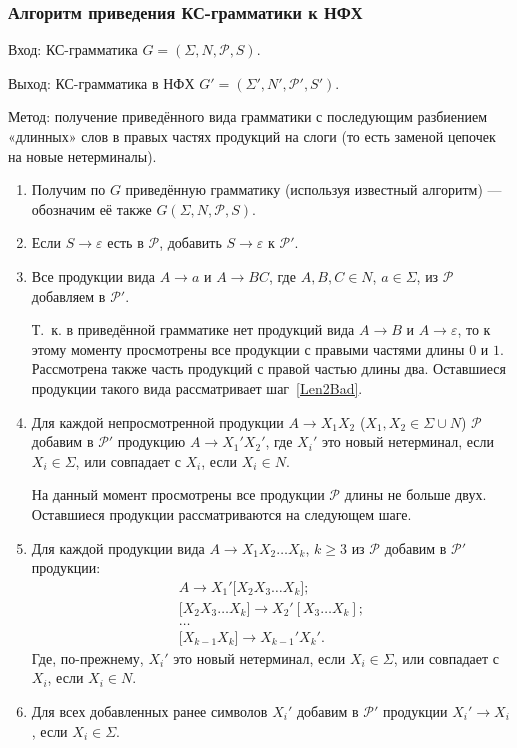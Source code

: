 \documentclass[12pt]{article}
\begin{document}
\subsubsection*{Алгоритм приведения КС-грамматики к НФХ}
Вход: КС-грамматика $G=(\Sigma, N, \mathcal P, S)$.

Выход: КС-грамматика в НФХ $G'=(\Sigma', N', \mathcal P', S')$.

Метод: получение приведённого вида грамматики с последующим разбиением «длинных» слов в правых частях продукций на слоги (то есть заменой цепочек на новые нетерминалы).

\begin{enumerate}
	\item Получим по $G$ приведённую грамматику (используя известный алгоритм) —
	обозначим её также $G(\Sigma,N,\mathcal P, S)$.
	\item Если $S\to\varepsilon$ есть в $\mathcal P$, добавить $S\to\varepsilon$ к $\mathcal P'$.
	\item Все продукции вида $A \to a$ и $A\to BC$, где $A,B,C\in N$, $a\in \Sigma$, из $\mathcal P$ добавляем в $\mathcal P'$.
	\begin{note}Т.~к. в приведённой грамматике нет продукций вида $A\to B$ и $A\to \varepsilon$, то к этому моменту просмотрены все продукции с правыми частями длины $0$ и $1$. Рассмотрена также часть продукций с правой частью длины два. Оставшиеся продукции такого вида рассматривает шаг~\ref{Len2Bad}.\end{note}
	\item\label{Len2Bad} Для каждой непросмотренной продукции $A\to X_1X_2$ ($X_1,X_2\in\Sigma\cup N$) $\mathcal P$ добавим в $\mathcal P'$ продукцию $A\to X_1'X_2'$, где $X_i'$ это новый нетерминал, если $X_i\in\Sigma$, или совпадает с $X_i$, если $X_i\in N$.
	\begin{note}На данный момент просмотрены все продукции $\mathcal P$ длины не больше двух. Оставшиеся продукции рассматриваются на следующем шаге.\end{note}
	\item Для каждой продукции вида $A\to X_1X_2\ldots X_k$, $k\geqslant 3$ из $\mathcal P$ добавим в $\mathcal P'$ продукции: 
	$$\begin{array}{l}
		A\to X_1'\lbrack X_2X_3\ldots X_k\rbrack;\\
		\lbrack X_2X_3\ldots X_k\rbrack\to X_2'[X_3\ldots X_k];\\
		\ldots\\
		\lbrack X_{k-1}X_k\rbrack\to X_{k-1}'X_k'.
	\end{array}$$
	Где, по-прежнему, $X_i'$ это новый нетерминал, если $X_i\in\Sigma$, или совпадает с $X_i$, если $X_i\in N$.
	\item Для всех добавленных ранее символов $X_i'$ добавим в $\mathcal P'$ продукции $X_i'\to X_i$, если $X_i\in\Sigma$.
\end{enumerate}
\end{document}
